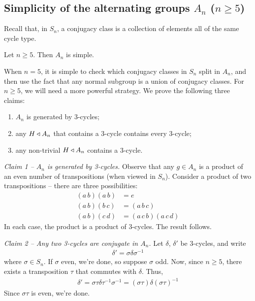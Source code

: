 \documentclass{../template/note}
\begin{document}
    \subsection{Simplicity of the alternating groups $A_n$ ($n \geq 5$)}
    
    Recall that, in $S_n$, a conjugacy class is a collection of elements all of the same cycle type.

    \begin{theorem}
        Let $n \geq 5$. Then $A_n$ is simple.
    \end{theorem}
    
    When $n=5$, it is simple to check which conjugacy classes in $S_n$ split in $A_n$, and then use the fact that any normal subgroup is a union of conjugacy classes. For $n \geq 5$, we will need a more powerful strategy. We prove the following three claims:
    \begin{enumerate}
        \item $A_n$ is generated by 3-cycles;
        \item any $H \triangleleft A_n$ that contains a 3-cycle contains every 3-cycle;
        \item any non-trivial $H \triangleleft A_n$ contains a 3-cycle.
    \end{enumerate}
    
    \emph{Claim 1 -- $A_n$ is generated by 3-cycles.} Observe that any $g \in A_n$ is a product of an even number of transpositions (when viewed in $S_n$). Consider a product of two transpositions -- there are three possibilities:
    \begin{align*}
        (a\, b)(a\, b) &= e \\
        (a\, b)(b\, c) &= (a\, b\, c) \\
        (a\, b)(c\, d) &= (a\, c\, b)(a\, c\, d)
    \end{align*}
    In each case, the product is a product of 3-cycles. The result follows.
    
    \emph{Claim 2 -- Any two 3-cycles are conjugate in $A_n$.} Let $\delta$, $\delta'$ be 3-cycles, and write
    \begin{align*}
        \delta' = \sigma \delta \sigma^{-1}
    \end{align*}
    where $\sigma \in S_n$. If $\sigma$ even, we're done, so suppose $\sigma$ odd. Now, since $n \geq 5$, there exists a transposition $\tau$ that commutes with $\delta$. Thus,
    \begin{align*}
        \delta' = \sigma \tau \delta \tau^{-1} \sigma^{-1} = (\sigma \tau)\delta(\sigma \tau)^{-1}
    \end{align*}
    Since $\sigma \tau$ is even, we're done.
\end{document}
